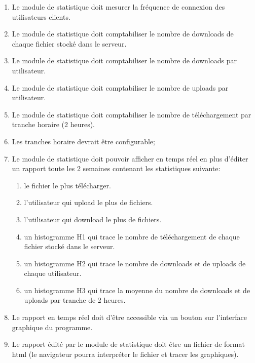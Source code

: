 \documentclass[10pt,a4paper]{report}
\begin{document}
		\begin{enumerate}
			\item Le module de statistique doit mesurer la fréquence de connexion des utilisateurs clients.

			\item Le module de statistique doit comptabiliser le nombre de downloads de chaque fichier stocké dans le serveur.

			\item Le module de statistique doit comptabiliser le nombre de downloads par utilisateur.

			\item Le module de statistique doit comptabiliser le nombre de uploads par utilisateur.

			\item Le module de statistique doit comptabiliser le nombre de téléchargement par tranche horaire (2 heures).

			\item Les tranches horaire devrait être configurable;

			\item Le module de statistique doit pouvoir afficher en temps réel en plus d'éditer un rapport toute les 2 semaines contenant les statistiques suivante:

			\begin{enumerate}[label=\arabic*.]
				\item le fichier le plus télécharger.

				\item l'utilisateur qui upload le plus de fichiers.

				\item l'utilisateur qui download le plus de fichiers.

				\item un histogramme H1 qui trace le nombre de téléchargement de chaque fichier stocké dans le serveur.

				\item un histogramme H2 qui trace le nombre de downloads et de uploads de chaque utilisateur.

				\item un histogramme H3 qui trace la moyenne du nombre de downloads et de uploads par tranche de 2 heures.
			\end{enumerate}

			\item Le rapport en temps réel doit d'être accessible via un bouton sur l'interface graphique du programme.

			\item Le rapport édité par le module de statistique doit être un fichier de format html (le navigateur pourra interpréter le fichier et tracer les graphiques).
		\end{enumerate}
	
\end{document}

